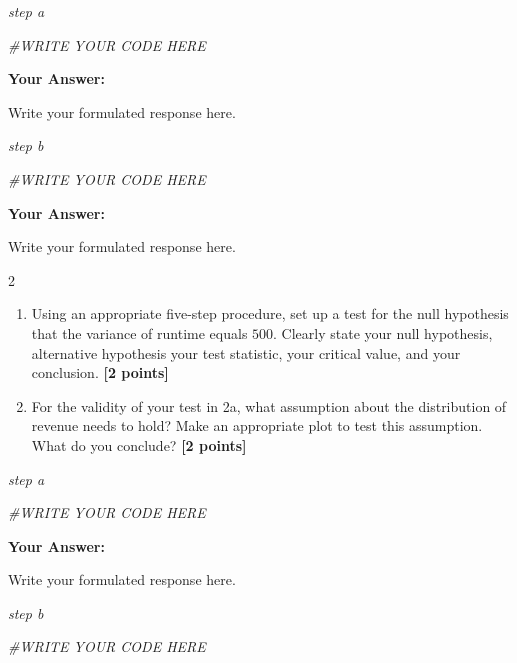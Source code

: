 \documentclass[
]{article}
\newenvironment{Shaded}{\begin{snugshade}}{\end{snugshade}}
\newcommand{\CommentTok}[1]{\textcolor[rgb]{0.56,0.35,0.01}{\textit{#1}}}
\providecommand{\tightlist}{%
  \setlength{\itemsep}{0pt}\setlength{\parskip}{0pt}}
\begin{document}
\emph{step a}

\begin{Shaded}
\begin{Highlighting}[]
\CommentTok{\#WRITE YOUR CODE HERE}
\end{Highlighting}
\end{Shaded}

\textbf{Your Answer:}

Write your formulated response here.

\emph{step b}

\begin{Shaded}
\begin{Highlighting}[]
\CommentTok{\#WRITE YOUR CODE HERE}
\end{Highlighting}
\end{Shaded}

\textbf{Your Answer:}

Write your formulated response here.

2

\begin{enumerate}
\def\labelenumi{\alph{enumi}.}
\tightlist
\item
  Using an appropriate five-step procedure, set up a test for the null
  hypothesis that the variance of runtime equals \(500\). Clearly state
  your null hypothesis, alternative hypothesis your test statistic, your
  critical value, and your conclusion. \textbf{[2 points]}
\item
  For the validity of your test in 2a, what assumption about the
  distribution of revenue needs to hold? Make an appropriate plot to
  test this assumption. What do you conclude? \textbf{[2 points]}
\end{enumerate}

\emph{step a}

\begin{Shaded}
\begin{Highlighting}[]
\CommentTok{\#WRITE YOUR CODE HERE}
\end{Highlighting}
\end{Shaded}

\textbf{Your Answer:}

Write your formulated response here.

\emph{step b}

\begin{Shaded}
\begin{Highlighting}[]
\CommentTok{\#WRITE YOUR CODE HERE}
\end{Highlighting}
\end{Shaded}
\end{document}
